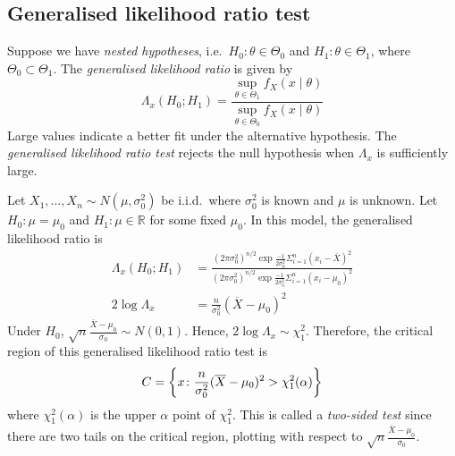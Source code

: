 \subsection{Generalised likelihood ratio test}
\begin{definition}
	Suppose we have \textit{nested hypotheses}, i.e.\ \( H_0 \colon \theta \in \Theta_0 \) and \( H_1 \colon \theta \in \Theta_1 \), where \( \Theta_0 \subset \Theta_1 \).
	The \textit{generalised likelihood ratio} is given by
	\[ \Lambda_x(H_0; H_1) = \frac{\sup_{\theta \in \Theta_1} f_X(x \mid \theta)}{\sup_{\theta \in \Theta_0} f_X(x \mid \theta)} \]
	Large values indicate a better fit under the alternative hypothesis.
	The \textit{generalised likelihood ratio test} rejects the null hypothesis when \( \Lambda_x \) is sufficiently large.
\end{definition}
\begin{example}
	Let \( X_1, \dots, X_n \sim N(\mu, \sigma_0^2) \) be i.i.d.\ where \( \sigma_0^2 \) is known and \( \mu \) is unknown.
	Let \( H_0 \colon \mu = \mu_0 \) and \( H_1 \colon \mu \in \mathbb R \) for some fixed \( \mu_0 \).
	In this model, the generalised likelihood ratio is
	\begin{align*}
		\Lambda_x(H_0; H_1) &= \frac{(2 \pi \sigma_0^2)^{n/2} \exp{\frac{-1}{2\sigma_0^2} \Sigma_{i=1}^n (x_i - \overline X)^2}}{(2 \pi \sigma_0^2)^{n/2} \exp{\frac{-1}{2\sigma_0^2} \Sigma_{i=1}^n (x_i - \mu_0)^2}} \\
		2\log \Lambda_x &= \frac{n}{\sigma_0^2}(\overline X - \mu_0)^2
	\end{align*}
	Under \( H_0 \), \( \sqrt{n} \frac{\overline X - \mu_0}{\sigma_0} \sim N(0,1) \).
	Hence, \( 2 \log \Lambda_x \sim \chi_1^2 \).
	Therefore, the critical region of this generalised likelihood ratio test is
	\[ C = \qty{x \colon \frac{n}{\sigma_0^2}(\overline X - \mu_0)^2 > \chi_1^2(\alpha)} \]
	where \( \chi_1^2(\alpha) \) is the upper \( \alpha \) point of \( \chi_1^2 \).
	This is called a \textit{two-sided test} since there are two tails on the critical region, plotting with respect to \( \sqrt{n} \frac{\overline X - \mu_0}{\sigma_0} \).
\end{example}

